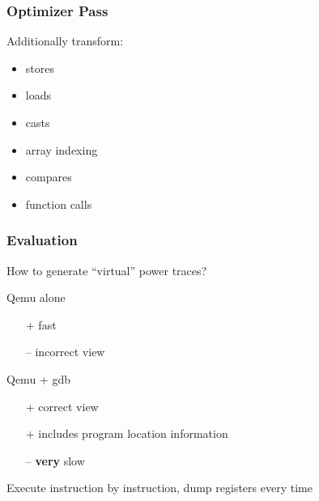 \documentclass[11pt,t,usepdftitle=false,aspectratio=169]{beamer}
\begin{document}
\begin{frame}
  \frametitle{Optimizer Pass}

  \vfill
  Additionally transform:
  \begin{itemize}
  \item stores
  \item loads
  \item casts
  \item array indexing
  \item compares
  \item function calls
  \end{itemize}
  \vfill
\end{frame}

\begin{frame}
  \frametitle{Evaluation}

  How to generate ``virtual'' power traces?
  
  \begin{block}{Qemu alone}
    \begin{itemize}
    \item[+] fast
    \item[--\hspace{0.4mm}] incorrect view
    \end{itemize}
  \end{block}
  \pause
  \begin{alertblock}{Qemu + gdb}
    \begin{itemize}
    \item[+] correct view
    \item[+] includes program location information
    \item[--\hspace{0.4mm}] \textbf{very} slow
    \end{itemize}
    Execute instruction by instruction, dump registers every time
  \end{alertblock}
\end{frame}
\end{document}
